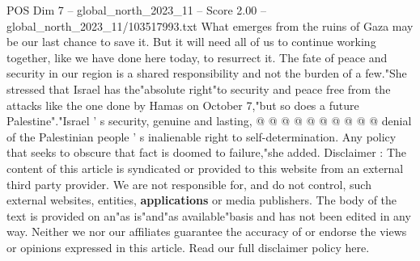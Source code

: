 \begin{textsample}{POS Dim 7 – global\_north\_2023\_11 – Score 2.00 – global\_north\_2023\_11/103517993.txt}
What emerges from the ruins of Gaza may be our last chance to save it.
But it will need all of us to continue working together, like we have done here today, to resurrect it.
The fate of peace and security in our region is a shared responsibility and not the burden of a few."She stressed that Israel has the"absolute right"to security and peace free from the attacks like the one done by Hamas on October 7,"but so does a future Palestine"."Israel ' s security, genuine and lasting, @ @ @ @ @ @ @ @ @ @ denial of the Palestinian people ' s inalienable right to self-determination.
Any policy that seeks to obscure that fact is doomed to failure,"she added.
Disclaimer : The content of this article is syndicated or provided to this website from an external third party provider.
We are not responsible for, and do not control, such external websites, entities, \textbf{applications} or media publishers.
The body of the text is provided on an"as is"and"as available"basis and has not been edited in any way.
Neither we nor our affiliates guarantee the accuracy of or endorse the views or opinions expressed in this article.
Read our full disclaimer policy here.

\end{textsample}
